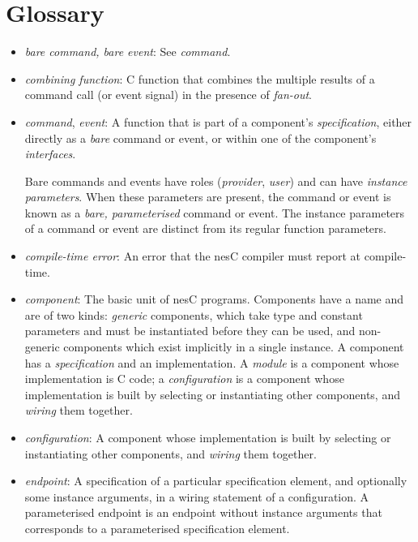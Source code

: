 \documentclass[11pt,letterpaper]{article}
\newcommand{\nesc}{nesC\xspace}
\begin{document}
\section{Glossary}
\label{sec:glossary}

\begin{itemize}

\item \emph{bare command, bare event}: See \emph{command}.

\item \emph{combining function}: C function that combines the multiple
results of a command call (or event signal) in the presence of
\emph{fan-out}.

\item \emph{command}, \emph{event}: A function that is part of a
component's \emph{specification}, either directly as a \emph{bare}
command or event, or within one of the component's \emph{interfaces}.

Bare commands and events have roles (\emph{provider}, \emph{user}) and can
have \emph{instance parameters}. When these parameters are present, the
command or event is known as a \emph{bare, parameterised} command or
event. The instance parameters of a command or event are distinct from its
regular function parameters.

\item \emph{compile-time error}: An error that the \nesc compiler must
report at compile-time.

\item \emph{component}: The basic unit of \nesc programs. Components have a
name and are of two kinds: \emph{generic} components, which take type and
constant parameters and must be instantiated before they can be used, and
non-generic components which exist implicitly in a single instance. A
component has a \emph{specification} and an implementation. A \emph{module}
is a component whose implementation is C code; a \emph{configuration} is a
component whose implementation is built by selecting or instantiating other
components, and \emph{wiring} them together.

\item \emph{configuration}: A component whose implementation is built by
selecting or instantiating other components, and \emph{wiring} them
together.

\item \emph{endpoint}: A specification of a particular specification
element, and optionally some instance arguments, in a wiring
statement of a configuration. A parameterised endpoint is an endpoint
without instance arguments that corresponds to a parameterised specification
element.


\end{itemize}
\end{document}
